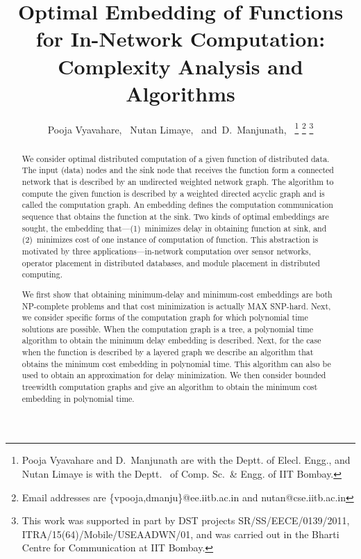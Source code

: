 \documentclass[journal]{IEEEtran}
\begin{document}
\title{Optimal Embedding of Functions for In-Network Computation:
  Complexity Analysis and Algorithms}

\author{Pooja Vyavahare,~\IEEEmembership{} Nutan
  Limaye,~\IEEEmembership{} and~D.~Manjunath,~
  \thanks{Pooja Vyavahare and D.~Manjunath are with the Deptt. of
    Elecl. Engg., and Nutan Limaye is with the Deptt.~ of Comp.
    Sc.~\& Engg. of IIT Bombay.}  \thanks{Email addresses are
    \{vpooja,dmanju\}@ee.iitb.ac.in and {nutan}@cse.iitb.ac.in }
  \thanks{This work was supported in part by DST projects SR/SS/EECE/0139/2011, ITRA/15(64)/Mobile/USEAADWN/01, and was
    carried out in the Bharti Centre for Communication at IIT Bombay.}
}

\maketitle

\begin{abstract}
  We consider optimal distributed computation of a given function of
  distributed data. The input (data) nodes and the sink node that
  receives the function form a connected network that is described by
  an undirected weighted network graph. The algorithm to compute the
  given function is described by a weighted directed acyclic graph and
  is called the computation graph. An embedding defines the
  computation communication sequence that obtains the function at the
  sink. Two kinds of optimal embeddings are sought, the embedding
  that---(1)~minimizes delay in obtaining function at sink, and
  (2)~minimizes cost of one instance of computation of function. This
  abstraction is motivated by three applications---in-network
  computation over sensor networks, operator placement in distributed
  databases, and module placement in distributed computing.

  We first show that obtaining minimum-delay and minimum-cost
  embeddings are both NP-complete problems and that cost minimization
  is actually MAX SNP-hard. Next, we consider specific forms of the
  computation graph for which polynomial time solutions are
  possible. When the computation graph is a tree, a polynomial time
  algorithm to obtain the minimum delay embedding is described. Next,
  for the case when the function is described by a layered graph we
  describe an algorithm that obtains the minimum cost embedding in
  polynomial time. This algorithm can also be used to obtain an
  approximation for delay minimization. We then consider bounded
  treewidth computation graphs and give an algorithm to obtain the
  minimum cost embedding in polynomial time.
\end{abstract}
\end{document}
